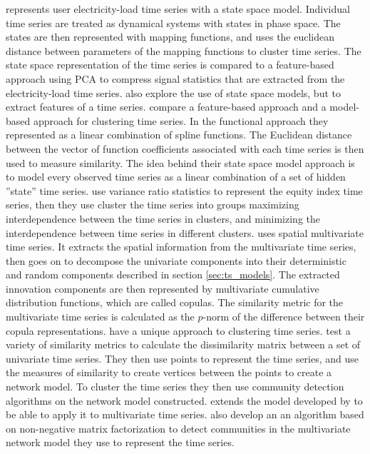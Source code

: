 \textcite{load_tsc_state_space_model} represents user electricity-load time series with a state space model. Individual time series are treated as dynamical systems with states in phase space. 
The states are then represented with mapping functions, and uses the euclidean distance between parameters of the mapping functions to cluster time series.
The state space representation of the time series is compared to a feature-based approach using PCA to compress signal statistics that are extracted from the electricity-load time series.
\textcite{stock_price_tsc_regr_trees_som} also explore the use of state space models, but to extract features of a time series.
\textcite{hier_clust_w_state_space_models} compare a feature-based approach and a model-based approach for clustering time series. 
In the functional approach they represented as a linear combination of spline functions. 
The Euclidean distance between the vector of function coefficients associated with each time series is then used to measure similarity.
The idea behind their state space model approach is to model every observed time series as a linear combination of a set of hidden ''state'' time series. 
\textcite{financial_tsc_variance_ratio} use variance ratio statistics to represent the equity index time series, then they use cluster the time series into groups maximizing interdependence between the time series in clusters, and minimizing the interdependence between time series in different clusters. 
\textcite{copula_fuzzy_tsc_spatial} uses spatial multivariate time series. 
It extracts the spatial information from the multivariate time series, then goes on to decompose the univariate components into their deterministic and random components described in section \ref{sec:ts_models}.
The extracted innovation components are then represented by multivariate cumulative distribution functions, which are called copulas. 
The similarity metric for the multivariate time series is calculated as the $p$-norm of the difference between their copula representations.
\textcite{community_detection_networks_tsc, multivar_tsc_community_detection} have a unique approach to clustering time series. 
\textcite{community_detection_networks_tsc} test a variety of similarity metrics to calculate the dissimilarity matrix between a set of univariate time series. 
They then use points to represent the time series, and use the measures of similarity to create vertices between the points to create a network model. 
To cluster the time series they then use community detection algorithms on the network model constructed. 
\textcite{multivar_tsc_community_detection} extends the model developed by \textcite{community_detection_networks_tsc} to be able to apply it to multivariate time series.
\textcite{multivar_tsc_community_detection} also develop an an algorithm based on non-negative matrix factorization to detect communities in the multivariate network model they use to represent the time series.

